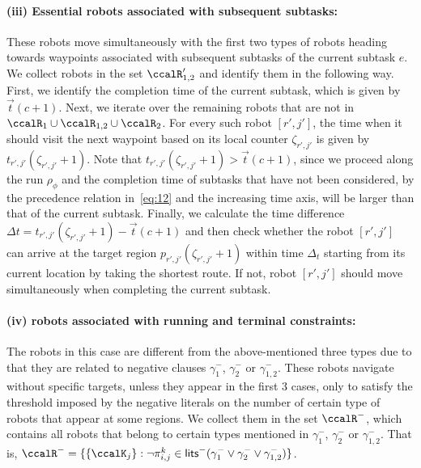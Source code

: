\documentclass[Afour,sageh,times]{sagej}
\renewcommand{\ap}[3]{\mathcal{\pi}_{{#1},{#2}}^{#3}}
\begin{document}
{{\paragraph{(iii) Essential robots associated with subsequent subtasks:} These robots move simultaneously with the first two types of robots heading towards  waypoints associated with subsequent subtasks of the current subtask $e$. We collect robots in the set $\ccalR'_{1,2}$ and identify them in the following way. First, we identify the completion time  of the current subtask, which is given by $\vec{t}(c+1)$.  Next, we iterate over the remaining robots that are not in $\ccalR_1 \cup \ccalR_{1,2} \cup \ccalR_2$. For every such robot $[r',j']$, the time when it should visit the next waypoint based on its local counter $\zeta_{r',j'}$ is given by $t_{r',j'}(\zeta_{r',j'}+1)$. Note that {$t_{r', j'}(\zeta_{r',j'}+1) > \vec{t}(c+1)$}, since we proceed along the run $\rho_\phi$ and the completion time of  subtasks that have not been considered, by the precedence relation in~\eqref{eq:12} and the increasing time axis, will be larger than that of the current subtask. Finally, we calculate the time difference $\Delta t = t_{r', j'}(\zeta_{r',j'}+1) - \vec{t}(c+1)$  and then check whether the robot $[r', j']$ can arrive at the target region $p_{r',j'}(\zeta_{r',j'}+1)$  within time $\Delta_t$ starting from  its current location by taking the shortest route. {If not, robot $[r', j']$ should move simultaneously when completing the current subtask.}
\paragraph{(iv) robots associated with running and terminal constraints:} The robots in this case  are different from the above-mentioned three types due to that they are related to negative clauses $\gamma_1^-$, $\gamma_2^-$ or $\gamma_{1,2}^-$. These robots navigate without specific targets, unless they appear in the first 3 cases, only to satisfy the threshold imposed by the negative literals on the number of certain type of robots that appear at some regions. We collect them in the set $\ccalR^-$, which contains all robots that belong to certain types mentioned in $\gamma_1^-$, $\gamma_2^-$ or $\gamma_{1,2}^-$. That is, $\ccalR^- = \{\{\ccalK_j\}: \neg \ap{i}{j}{k} \in \mathsf{lits}^- (\gamma_1^- \vee \gamma_2^- \vee \gamma_{1,2}^-) \}$.

}}
\end{document}
